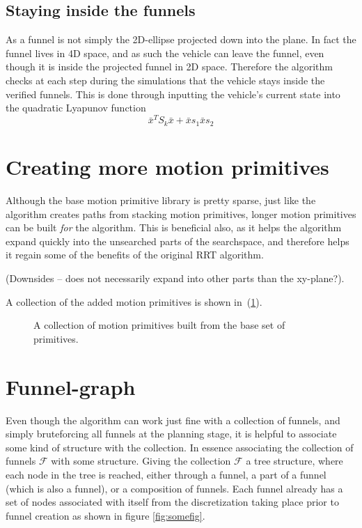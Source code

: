 \subsection{Staying inside the funnels}

As a funnel is not simply the 2D-ellipse projected down into the plane. In fact
the funnel lives in 4D space, and as such the vehicle can leave the funnel, even
though it is inside the projected funnel in 2D space. Therefore the \rrtfunnel{}
algorithm checks at each step during the simulations that the vehicle stays
inside the verified funnels. This is done through inputting the vehicle's
current state into the quadratic Lyapunov function
\[
  {\bar{x}}^{T}S_{k}\bar{x} + \bar{x}s_{1} \bar{x} s_{2}
\]

\section{Creating more motion primitives}

Although the base motion primitive library is pretty sparse, just like the
\rrtfunnel{} algorithm creates paths from stacking motion primitives, longer
motion primitives can be built \textit{for} the \rrtfunnel{} algorithm. This is
beneficial also, as it helps the algorithm expand quickly into the unsearched
parts of the searchspace, and therefore helps it regain some of the benefits of
the original \ac{RRT} algorithm.

(Downsides -- does not necessarily expand into other parts than the xy-plane?).

A collection of the added motion primitives is shown
in~(\ref{fig:expanded-motion-primitives}).

\begin{figure}
  \caption{A collection of motion primitives built from the base set of
    primitives.}
  \label{fig:expanded-motion-primitives}
\end{figure}

\subsection{}

\section{Funnel-graph}

Even though the \rrtfunnel{} algorithm can work just fine with a collection of
funnels, and simply bruteforcing all funnels at the planning stage, it is
helpful to associate some kind of structure with the collection. In essence
associating the collection of funnels \(\mathcal{F}\) with some structure.
Giving the collection \(\mathcal{F}\) a tree structure, where each node in the
tree is reached, either through a funnel, a part of a funnel (which is also a
funnel), or a composition of funnels. Each funnel already has a set of nodes
associated with itself from the discretization taking place prior to funnel
creation as shown in figure \ref{fig:somefig}.

